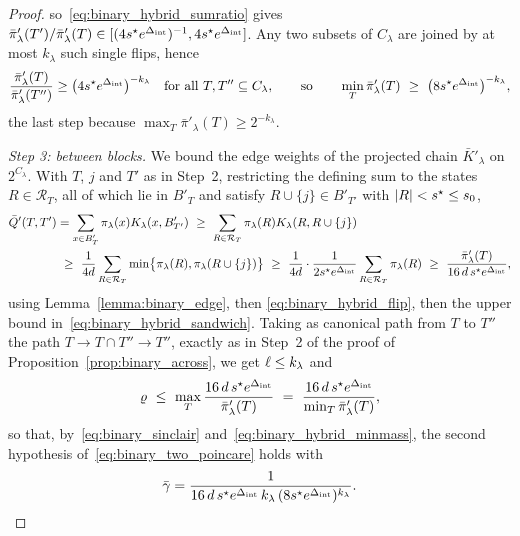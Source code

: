 \documentclass[aos]{imsart}%
\DeclarePairedDelimiter{\abs}{\lvert}{\rvert}
\theoremstyle{plain}
\theoremstyle{definition}
\begin{document}
\begin{proof}
        so~\eqref{eq:binary_hybrid_sumratio} gives
        $\bar\pi'_\lambda(T')/\bar\pi'_\lambda(T)\in
        [(4s^{\star}e^{\Delta_{\mathrm{int}}})^{-1},4s^{\star}e^{\Delta_{\mathrm{int}}}]$. Any two subsets
        of $C_\lambda$ are joined by at most $k_\lambda$ such single flips,
        hence
        \begin{equation}
            \label{eq:binary_hybrid_minmass}
            \frac{\bar\pi'_\lambda(T)}{\bar\pi'_\lambda(T'')}
            \geq\bigl(4s^{\star}e^{\Delta_{\mathrm{int}}}\bigr)^{-k_\lambda}
            \quad\text{for all }T,T''\subseteq C_\lambda,
            \qquad\text{so}\qquad
            \min_T\bar\pi'_\lambda(T)\ \geq\
            \bigl(8s^{\star}e^{\Delta_{\mathrm{int}}}\bigr)^{-k_\lambda},
        \end{equation}
        the last step because $\max_T\bar\pi'_\lambda(T)\geq2^{-k_\lambda}$.

        \emph{Step 3: between blocks.} We bound the edge weights of the
        projected chain $\bar K'_\lambda$ on $2^{C_\lambda}$. With $T$, $j$ and
        $T'$ as in Step~2, restricting the defining sum to the states
        $R\in\mathcal{R}_T$, all of which lie in $B'_T$ and satisfy
        $R\cup\{j\}\in B'_{T'}$ with $\abs R<s^{\star}\leq s_0$,
        \begin{align*}
            \bar Q'(T,T')
            &=\sum_{x\in B'_T}\pi_\lambda(x)K_\lambda(x,B'_{T'})
            \ \geq\ \sum_{R\in\mathcal{R}_T}
            \pi_\lambda(R)K_\lambda(R,R\cup\{j\})\\
            &\ \geq\ \frac{1}{4d}\sum_{R\in\mathcal{R}_T}
            \min\bigl\{\pi_\lambda(R),\pi_\lambda(R\cup\{j\})\bigr\}
            \ \geq\ \frac{1}{4d}\cdot\frac{1}{2s^{\star}e^{\Spread}}
            \sum_{R\in\mathcal{R}_T}\pi_\lambda(R)
            \ \geq\ \frac{\bar\pi'_\lambda(T)}{16\,d\,s^{\star}e^{\Spread}},
        \end{align*}
        using Lemma~\ref{lemma:binary_edge}, then
        \eqref{eq:binary_hybrid_flip}, then the upper bound
        in~\eqref{eq:binary_hybrid_sandwich}. Taking as canonical path from $T$
        to $T''$ the path $T\to T\cap T''\to T''$, exactly as in Step~2 of the
        proof of Proposition~\ref{prop:binary_across}, we get
        $\ell\leq k_\lambda$ and
        \begin{equation*}
            \Cong\ \leq\ \max_{T}\frac{16\,d\,s^{\star}e^{\Spread}}
            {\bar\pi'_\lambda(T)}
            \ =\ \frac{16\,d\,s^{\star}e^{\Spread}}
            {\min_T\bar\pi'_\lambda(T)},
        \end{equation*}
        so that, by~\eqref{eq:binary_sinclair}
        and~\eqref{eq:binary_hybrid_minmass}, the second hypothesis
        of~\eqref{eq:binary_two_poincare} holds with
        \begin{equation*}
            \bar\gamma=\frac{1}{16\,d\,s^{\star}e^{\Delta_{\mathrm{int}}}\,k_\lambda\,
            (8s^{\star}e^{\Delta_{\mathrm{int}}})^{k_\lambda}} .
        \end{equation*}


\end{proof}
\end{document}
